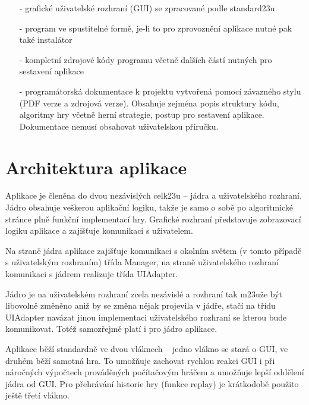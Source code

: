 \documentclass{article}
\begin{document}
\begin{enumerate}
	\item[-]grafick\'e u\v{z}ivatelsk\'e rozhran\'i (GUI) se zpracovan\'e podle standard\accent23u
	\item[-]program ve spustiteln\'e form\v{e}, je-li to pro zprovozn\v{e}n\'i aplikace nutn\'e pak tak\'e instal\'ator
	\item[-]kompletn\'i zdrojov\'e k\'ody programu v\v{c}etn\v{e} dal\v{s}\'ich \v{c}\'ast\'i nutn\'ych pro sestaven\'i aplikace
	\item[-]program\'atorsk\'a dokumentace k projektu vytvo\v{r}en\'a pomoc\'i z\'avazn\'eho stylu (PDF verze a zdrojov\'a verze). Obsahuje zejm\'ena popis struktury k\'odu, algoritmy hry v\v{c}etn\v{e} hern\'i strategie, postup pro sestaven\'i aplikace. Dokumentace nemus\'i obsahovat u\v{z}ivatelskou p\v{r}\'iru\v{c}ku.
\end{enumerate}



\section{Architektura aplikace}

Aplikace je \v{c}len\v{e}na do dvou nez\'avisl\'ych celk\accent23u – j\'adra a u\v{z}ivatelsk\'eho rozhran\'i. J\'adro obsahuje ve\v{s}kerou aplika\v{c}n\'i logiku, tak\v{z}e je samo o sob\v{e} po algoritmick\'e str\'ance pln\v{e} funk\v{c}n\'i implementac\'i hry. Grafick\'e rozhran\'i p\v{r}edstavuje zobrazovac\'i logiku aplikace a zaji\v{s}\v{t}uje komunikaci s u\v{z}ivatelem.\medskip

Na stran\v{e} j\'adra aplikace zaji\v{s}\v{t}uje komunikaci s okoln\'im sv\v{e}tem (v tomto p\v{r}\'ipad\v{e} s u\v{z}ivatelsk\'ym rozhran\'im) t\v{r}\'ida Manager, na stran\v{e} u\v{z}ivatelsk\'eho rozhran\'i komunikaci s j\'adrem realizuje t\v{r}\'ida UIAdapter.\medskip

J\'adro je na u\v{z}ivatelsk\'em rozhran\'i zcela nez\'avisl\'e a rozhran\'i tak m\accent23u\v{z}e b\'yt libovoln\v{e} zm\v{e}n\v{e}no ani\v{z} by se zm\v{e}na n\v{e}jak projevila v j\'ad\v{r}e, sta\v{c}\'i na t\v{r}\'idu UIAdapter nav\'azat jinou implementaci u\v{z}ivatelsk\'eho rozhran\'i se kterou bude komunikovat. Tot\'e\v{z} samoz\v{r}ejm\v{e} plat\'i i pro j\'adro aplikace.\medskip

Aplikace b\v{e}\v{z}\'i standardn\v{e} ve dvou vl\'aknech – jedno vl\'akno se star\'a o GUI, ve druh\'em b\v{e}\v{z}\'i samotn\'a hra. To umo\v{z}\v{n}uje zachovat rychlou reakci GUI i p\v{r}i n\'aro\v{c}n\'ych v\'ypo\v{c}tech prov\'ad\v{e}n\'ych po\v{c}\'ita\v{c}ov\'ym hr\'a\v{c}em a umo\v{z}\v{n}uje lep\v{s}\'i odd\v{e}len\'i j\'adra od GUI. Pro p\v{r}ehr\'av\'an\'i historie hry (funkce replay) je kr\'atkodob\v{e} pou\v{z}ito je\v{s}t\v{e} t\v{r}et\'i vl\'akno.
\medskip
\end{document}
